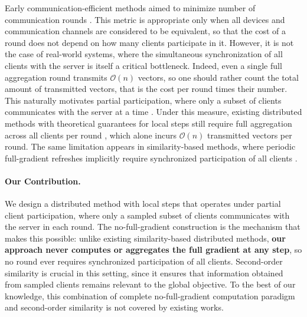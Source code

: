 \documentclass{article}
\begin{document}
Early communication-efficient methods aimed to minimize number of communication rounds \citep{mcmahan2017communication, stich2018local, kovalev2022optimal}. This metric is appropriate only when all devices and communication channels are considered to be equivalent, so that the cost of a round does not depend on how many clients participate in it. However, it is not the case of real-world systems, where the simultaneous synchronization of all clients with the server is itself a critical bottleneck. Indeed, even a single full aggregation round transmits $\mathcal{O}(n)$ vectors, so one should rather count the total amount of transmitted vectors, that is the cost per round times their number. This naturally motivates partial participation, where only a subset of clients communicates with the server at a time \citep{mcmahan2017communication}. Under this measure, existing 
distributed methods with theoretical guarantees for local steps 
still require full aggregation across all clients per round 
\citep{stich2018local, khaled2020tighter}, which alone incurs 
$\mathcal{O}(n)$ transmitted vectors per round. The same limitation 
appears in similarity-based methods, where periodic full-gradient 
refreshes implicitly require synchronized participation of all clients \citep{kovalev2022optimal, lin2023stochastic}.


\paragraph{Our Contribution.} \label{contribution}
We design a distributed method with local steps that operates under partial client participation, where only a sampled subset of clients communicates with the server in each round. The no-full-gradient construction is the mechanism that makes this possible: unlike existing similarity-based distributed methods, \textbf{our approach never computes or aggregates the full gradient at any step}, so no round ever requires synchronized participation of all clients. Second-order similarity is crucial in this setting, since it ensures that information obtained from sampled clients remains relevant to the global objective. To the best of our knowledge, this combination of complete no-full-gradient computation paradigm and second-order similarity is not covered by existing works.
\end{document}
